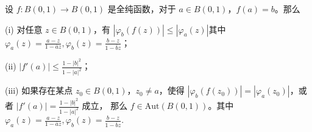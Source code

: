 \documentclass[../../main.tex]{subfiles}
\begin{document}
\begin{theorem}\label{theorem:Schwarz-Pick定理-定理4.5.6}
设 \( f: B(0,1) \to B(0,1) \) 是全纯函数，对于 \( a \in B(0,1) \)，\( f(a) = b \)。那么

(i) 对任意 \( z \in B(0,1) \)，有 \( |\varphi_b(f(z))| \leq |\varphi_a(z)| \)其中$\varphi_a(z) = \frac{a - z}{1 - \overline{a} z},\varphi_b(z) = \frac{b - z}{1 - \overline{b} z}$；

(ii) \( |f'(a)| \leq \frac{1 - |b|^2}{1 - |a|^2} \)；

(iii) 如果存在某点 \( z_0 \in B(0,1) \)，\( z_0 \neq a \)，使得 \( |\varphi_b(f(z_0))| = |\varphi_a(z_0)| \)，或者 \( |f'(a)| = \frac{1 - |b|^2}{1 - |a|^2} \) 成立，
那么 \( f \in \text{Aut}(B(0,1)) \)。其中$\varphi_a(z) = \frac{a - z}{1 - \overline{a} z},\varphi_b(z) = \frac{b - z}{1 - \overline{b} z}.$
\end{theorem}
\end{document}
